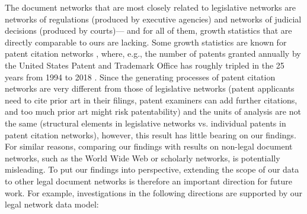 The document networks that are most closely related to legislative networks are networks of regulations (produced by executive agencies) and networks of judicial decisions (produced by courts)---%
and for all of them, growth statistics that are directly comparable to ours are lacking. 
Some growth statistics are known for patent citation networks \cite{strandburg:2006, strandburg:2009,torrance2017,uspto2020},
where, e.g., the number of patents granted annually by the United States Patent and Trademark Office has roughly tripled in the 25 years from 1994 to 2018 \cite{uspto2020}. 
Since the generating processes of patent citation networks are very different from those of legislative networks 
(patent applicants need to cite prior art in their filings, patent examiners can add further citations, and too much prior art might risk patentability) 
and the units of analysis are not the same (structural elements in legislative networks vs. individual patents in patent citation networks), 
however, this result has little bearing on our findings. 
For similar reasons, comparing our findings with results on non-legal document networks, 
such as the World Wide Web or scholarly networks, is potentially misleading.
To put our findings into perspective, 
extending the scope of our data to other legal document networks is therefore an important direction for future work.
For example, investigations in the following directions are supported by our legal network data model:
